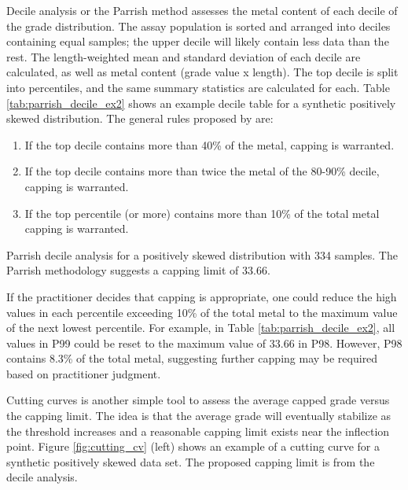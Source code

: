 Decile analysis or the Parrish method \citep{parrish1997geologist} assesses the metal content of each decile of the grade distribution. The assay population is sorted and arranged into deciles containing equal samples; the upper decile will likely contain less data than the rest. The length-weighted mean and standard deviation of each decile are calculated, as well as metal content (grade value x length). The top decile is split into percentiles, and the same summary statistics are calculated for each. Table \ref{tab:parrish_decile_ex2} shows an example decile table for a synthetic positively skewed distribution. The general rules proposed by \cite{parrish1997geologist} are:
\begin{enumerate}[noitemsep]
    \item If the top decile contains more than 40\% of the metal, capping is warranted.
    \item If the top decile contains more than twice the metal of the 80-90\% decile, capping is warranted.
    \item If the top percentile (or more) contains more than 10\% of the total metal capping is warranted.
\end{enumerate}

\begin{table}[!htb]
    \centering
    \caption{Parrish decile analysis for a positively skewed distribution with 334 samples. The Parrish methodology suggests a capping limit of 33.66.}
    \resizebox{1\width}{!}{}
    \label{tab:parrish_decile_ex2}
\end{table}

If the practitioner decides that capping is appropriate, one could reduce the high values in each percentile exceeding 10\% of the total metal to the maximum value of the next lowest percentile. For example, in Table \ref{tab:parrish_decile_ex2}, all values in P99 could be reset to the maximum value of 33.66 in P98. However, P98 contains 8.3\% of the total metal, suggesting further capping may be required based on practitioner judgment.

Cutting curves \citep{roscoe1996cutting,leuangthong2015dealing} is another simple tool to assess the average capped grade versus the capping limit. The idea is that the average grade will eventually stabilize as the threshold increases and a reasonable capping limit exists near the inflection point. Figure \ref{fig:cutting_cv} (left) shows an example of a cutting curve for a synthetic positively skewed data set. The proposed capping limit is from the decile analysis.

